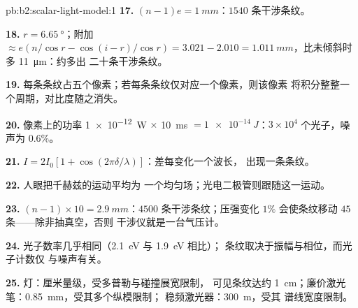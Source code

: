 \begin{solution}{pb:b2:scalar-light-model:1}
\textbf{17.} $(n - 1)e = \qty{1}{mm}$：$1540$ 条干涉条纹。

\textbf{18.} $r = \qty{6.65}{\degree}$；附加 $\approx e(n/\cos r - \cos(i - r)/\cos r)
= 3.021 - 2.010 = \qty{1.011}{mm}$，比未倾斜时多 \qty{11}{\micro m}：约多出
二十条干涉条纹。

\textbf{19.} 每条条纹占五个像素；若每条条纹仅对应一个像素，则该像素
将积分整整一个周期，对比度随之消失。

\textbf{20.} 像素上的功率 \qty{1e-12}{W} $\times$ \qty{10}{ms} $= \qty{1e-14}{J}$：$3 \times 10^4$
个光子，噪声为 $0.6\%$。

\textbf{21.} $I = 2I_0[1 + \cos(2\pi\delta/\lambda)]$：差每变化一个波长，
出现一条条纹。

\textbf{22.} 人眼把千赫兹的运动平均为
一个均匀场；光电二极管则跟随这一运动。

\textbf{23.} $(n - 1) \times 10 = \qty{2.9}{mm}$：$4500$ 条干涉条纹；压强变化 $1\%$
会使条纹移动 $45$ 条——除非抽真空，否则
干涉仪就是一台气压计。

\textbf{24.} 光子数率几乎相同（\qty{2.1}{eV} 与 \qty{1.9}{eV} 相比）；
条纹取决于振幅与相位，而光子计数仅
与噪声有关。

\textbf{25.} 灯：厘米量级，受多普勒与碰撞展宽限制，
可见条纹达约 \qty{1}{cm}；廉价激光笔：\qty{0.85}{mm}，受其多个纵模限制；
稳频激光器：\qty{300}{m}，受其
谱线宽度限制。
\end{solution}
